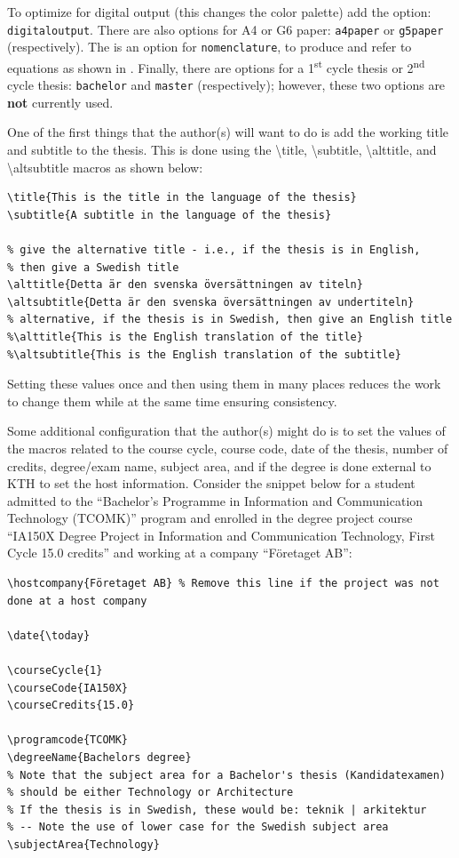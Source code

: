 \documentclass[main.tex]{subfiles}
\begin{document}
To optimize for digital output (this changes the color palette) add the option: \texttt{digitaloutput}. There are also options for A4 or G6 paper: \texttt{a4paper} or \texttt{g5paper} (respectively). The is an option for \texttt{nomenclature}, to produce and refer to equations
\ifnomenclature
as shown in 
\fi
.  Finally, there are options for a 1\textsuperscript{st} cycle thesis or 2\textsuperscript{nd} cycle thesis: \texttt{bachelor} and \texttt{master} (respectively); however, these two options are \textbf{not} currently used.

One of the first things that the author(s) will want to do is add the working title and subtitle to the thesis. This is done using the \textbackslash title, \textbackslash subtitle, \textbackslash alttitle, and \textbackslash altsubtitle macros as shown below:
\begin{lstlisting}[style=latexExampleForAuthors]
\title{This is the title in the language of the thesis}
\subtitle{A subtitle in the language of the thesis}

% give the alternative title - i.e., if the thesis is in English,
% then give a Swedish title
\alttitle{Detta är den svenska översättningen av titeln}
\altsubtitle{Detta är den svenska översättningen av undertiteln}
% alternative, if the thesis is in Swedish, then give an English title
%\alttitle{This is the English translation of the title}
%\altsubtitle{This is the English translation of the subtitle}   
\end{lstlisting}

Setting these values once and then using them in many places reduces the work to change them while at the same time ensuring consistency. 

Some additional configuration that the author(s) might do is to set the values of the macros related to the course cycle, course code, date of the thesis, number of credits, degree/exam name, subject area, and if the degree is done external to KTH to set the host information. Consider the snippet below for a student admitted to the ``Bachelor's Programme in Information and Communication Technology (TCOMK)'' program and enrolled in the degree project course ``IA150X Degree Project in Information and Communication Technology, First Cycle 15.0 credits'' and working at a company ``Företaget AB'':
\begin{lstlisting}[style=latexExampleForAuthors]
\hostcompany{Företaget AB} % Remove this line if the project was not done at a host company

\date{\today}

\courseCycle{1}
\courseCode{IA150X}
\courseCredits{15.0}

\programcode{TCOMK}
\degreeName{Bachelors degree}
% Note that the subject area for a Bachelor's thesis (Kandidatexamen)
% should be either Technology or Architecture
% If the thesis is in Swedish, these would be: teknik | arkitektur
% -- Note the use of lower case for the Swedish subject area
\subjectArea{Technology}
\end{lstlisting}
\end{document}
